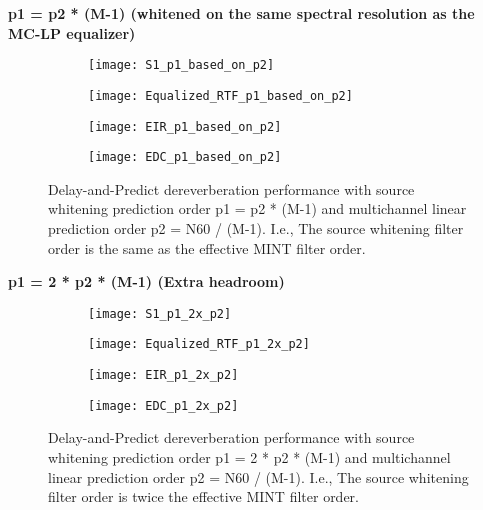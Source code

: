 \textbf{p1 = p2 * (M-1) (whitened on the same spectral resolution as the MC-LP equalizer)}

\begin{figure}[H]
	\centering
	\begin{subfigure}[b]{0.49\textwidth}
		\centering
		\texttt{[image: S1\_p1\_based\_on\_p2]}
	\end{subfigure}
	\hfill
	\begin{subfigure}[b]{0.49\textwidth}
		\centering
		\texttt{[image: Equalized\_RTF\_p1\_based\_on\_p2]}
	\end{subfigure}
	\hfill
	\begin{subfigure}[b]{0.49\textwidth}
		\centering
		\texttt{[image: EIR\_p1\_based\_on\_p2]}
	\end{subfigure}
	\hfill
	\begin{subfigure}[b]{0.49\textwidth}
		\centering
		\texttt{[image: EDC\_p1\_based\_on\_p2]}
	\end{subfigure}
	\hfill
	\caption{Delay-and-Predict dereverberation performance with source whitening prediction order p1 = p2 * (M-1) and multichannel linear prediction order p2 = N60 / (M-1). I.e., The source whitening filter order is the same as the effective MINT filter order.}
	\label{fig:params_p1_based_on_p2}
\end{figure}

\textbf{p1 = 2 * p2  * (M-1) (Extra headroom)}

\begin{figure}[H]
	\centering
	\begin{subfigure}[b]{0.49\textwidth}
		\centering
		\texttt{[image: S1\_p1\_2x\_p2]}
	\end{subfigure}
	\hfill
	\begin{subfigure}[b]{0.49\textwidth}
		\centering
		\texttt{[image: Equalized\_RTF\_p1\_2x\_p2]}
	\end{subfigure}
	\hfill
	\begin{subfigure}[b]{0.49\textwidth}
		\centering
		\texttt{[image: EIR\_p1\_2x\_p2]}
	\end{subfigure}
	\hfill
	\begin{subfigure}[b]{0.49\textwidth}
		\centering
		\texttt{[image: EDC\_p1\_2x\_p2]}
	\end{subfigure}
	\hfill
	\caption{Delay-and-Predict dereverberation performance with source whitening prediction order p1 = 2 * p2 * (M-1) and multichannel linear prediction order p2 = N60 / (M-1). I.e., The source whitening filter order is twice the effective MINT filter order.}
	\label{fig:params_p1_2x_p2}
\end{figure}

